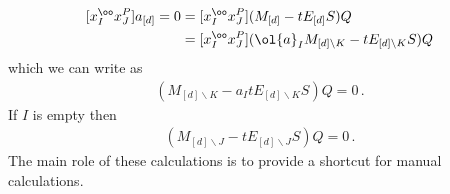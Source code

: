 \begin{align}\begin{split}
	 [x_I^\oo x_J^P] a_{[d]} = 0 &= [x_I^\oo x_J^P](M_{[d]} - tE_{[d]}S)Q \\
	 &= [x_I^\oo x_J^P](\ol{a}_{I} M_{[d]\backslash K} - t E_{[d]\backslash K} S)Q
\end{split}\end{align}
which we can write as
\begin{align}
	[x_I^\oo x_J^P]( M_{[d]\backslash K} - a_I t E_{[d]\backslash K} S)Q = 0\,.
\end{align}
If $I$ is empty then
\begin{align}
	[x_J^P]( M_{[d]\backslash J} - t E_{[d]\backslash J} S)Q = 0\,.
\end{align}
The main role of these calculations is to provide a shortcut for manual calculations.

